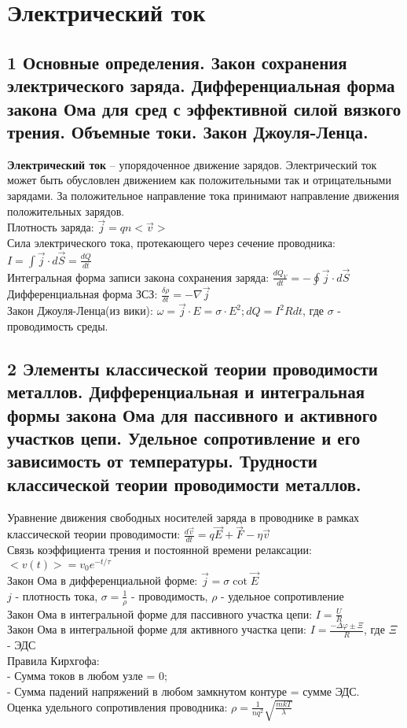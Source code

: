 \documentclass[a4paper,12pt]{article}
\begin{document}
\section{Электрический ток}
\subsection{1   Основные определения. Закон сохранения электрического заряда. Дифференциальная форма закона Ома для сред с эффективной силой вязкого трения. Объемные токи. Закон Джоуля-Ленца.}
\textbf{Электрический ток} – упорядоченное движение зарядов. Электрический ток может быть обусловлен движением как положительными так и отрицательными зарядами. За положительное направление тока принимают направление движения положительных зарядов.\\
Плотность заряда: $\vec{j} = qn<\vec{v}>$\\
Сила электрического тока, протекающего через сечение проводника: $I = \int \vec{j} \cdot d\vec{S} = \frac{dQ}{dt}$\\
Интегральная форма записи закона сохранения заряда: $\frac{dQ_V}{dt} = - \oint \vec{j} \cdot d\vec{S}$\\
Дифференциальная форма ЗСЗ: $\frac{\delta \rho}{\delta t} = - \nabla \vec{j}$\\
Закон Джоуля-Ленца(из вики): $\omega = \vec{j} \cdot E = \sigma \cdot E^2; dQ = I^2Rdt$, где $\sigma$ - проводимость среды.


\subsection{2	Элементы классической теории проводимости металлов. Дифференциальная и интегральная формы закона Ома для пассивного и активного участков цепи. Удельное сопротивление и его зависимость от температуры. Трудности классической теории проводимости металлов.}
Уравнение движения свободных носителей заряда в проводнике в рамках классической теории проводимости: $\frac{d \vec{v}}{dt} = q \vec{E} + \vec{F} - \eta \vec{v}$\\
Связь коэффициента трения и постоянной времени релаксации: $<v(t)> = v_0 e^{-t/\tau}$\\
Закон Ома в дифференциальной форме: $\vec{j} = \sigma \cot  \vec{E}$\\
$j$ - плотность тока, $\sigma = \frac{1}{\rho}$ - проводимость, $\rho$ - удельное сопротивление\\
Закон Ома в интегральной форме для пассивного участка цепи: $I = \frac{U}{R}$\\
Закон Ома в интегральной форме для активного участка цепи: $I = \frac{-\Delta \varphi \pm \Xi}{R}$, где $\Xi$ - ЭДС\\ 
Правила Кирхгофа:\\
- Сумма токов в любом узле = 0;\\
- Сумма падений напряжений в любом замкнутом контуре = сумме ЭДС.\\
Оценка удельного сопротивления проводника: $\rho = \frac{1}{nq^2} \sqrt{\frac{mkT}{\lambda}}$\\
\end{document}
